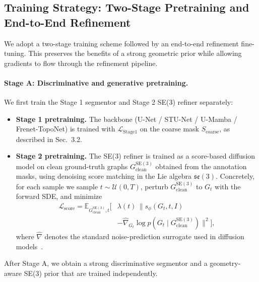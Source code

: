 \documentclass{article}
\newcommand{\SE}[1]{\mathrm{SE}(#1)}
\newcommand{\stageone}{Frenet-TopoNet}
\begin{document}
\subsection{Training Strategy: Two-Stage Pretraining and End-to-End Refinement}

We adopt a two-stage training scheme followed by an end-to-end refinement fine-tuning. This preserves the benefits of a strong geometric prior while allowing gradients to flow through the refinement pipeline.

\paragraph{Stage A: Discriminative and generative pretraining.}
We first train the Stage 1 segmentor and Stage 2 SE(3) refiner separately:

\begin{itemize}[leftmargin=*]
  \item \textbf{Stage 1 pretraining.}
  The backbone (U-Net / STU-Net / U-Mamba / \stageone) is trained with $\mathcal{L}_{\text{Stage1}}$ on the coarse mask $S_{\text{coarse}}$, as described in Sec.~3.2.
  \item \textbf{Stage 2 pretraining.}
  The SE(3) refiner is trained as a score-based diffusion model on clean ground-truth graphs $G^{\SE{3}}_{\text{clean}}$ obtained from the annotation masks, using denoising score matching in the Lie algebra $\mathfrak{se}(3)$. Concretely, for each sample we sample $t \sim \mathcal{U}(0, T)$, perturb $G^{\SE{3}}_{\text{clean}}$ to $G_t$ with the forward SDE, and minimize
\begin{equation}
\begin{split}
    \mathcal{L}_{\text{score}} = \mathbb{E}_{G^{\SE{3}}_{\text{clean}}, t} \Big[ & \lambda(t)\, \|s_\phi(G_t, t, I) \\
    & - \hat{\nabla}_{G_t}\log p(G_t \mid G^{\SE{3}}_{\text{clean}})\|^2 \Big],
\end{split}
\end{equation}
  where $\hat{\nabla}$ denotes the standard noise-prediction surrogate used in diffusion models~\cite{song2021score,ho2020denoising}.
\end{itemize}

After Stage A, we obtain a strong discriminative segmentor and a geometry-aware SE(3) prior that are trained independently.
\end{document}

